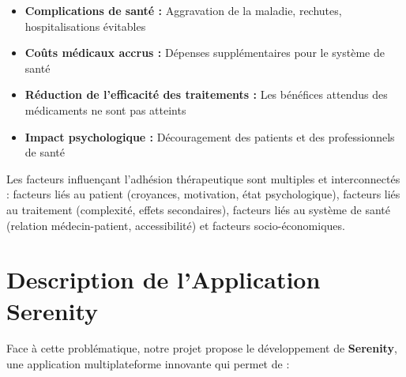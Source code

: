 \documentclass[12pt,a4paper]{report}
\begin{document}
\begin{itemize}
    \item \textbf{Complications de santé :} Aggravation de la maladie, rechutes, hospitalisations évitables
    \item \textbf{Coûts médicaux accrus :} Dépenses supplémentaires pour le système de santé
    \item \textbf{Réduction de l'efficacité des traitements :} Les bénéfices attendus des médicaments ne sont pas atteints
    \item \textbf{Impact psychologique :} Découragement des patients et des professionnels de santé
\end{itemize}

Les facteurs influençant l'adhésion thérapeutique sont multiples et interconnectés : facteurs liés au patient (croyances, motivation, état psychologique), facteurs liés au traitement (complexité, effets secondaires), facteurs liés au système de santé (relation médecin-patient, accessibilité) et facteurs socio-économiques.

\section{Description de l'Application Serenity}

Face à cette problématique, notre projet propose le développement de \textbf{Serenity}, une application multiplateforme innovante qui permet de :
\end{document}
